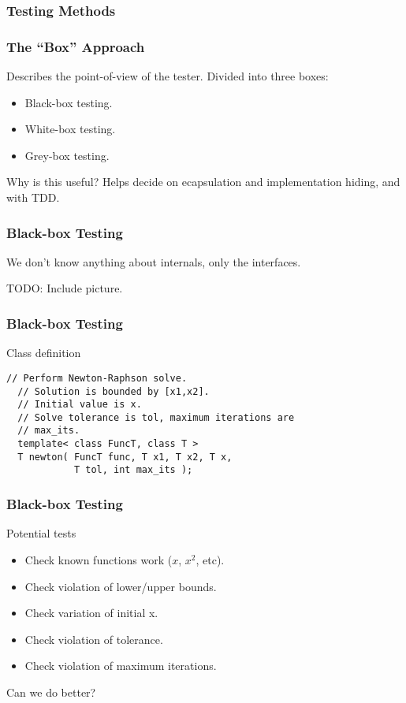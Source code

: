 \begin{frame}
  \frametitle{Testing Methods}
  \begin{tikzpicture}[overlay]  
  \end{tikzpicture}
\end{frame}

\begin{frame}
  \frametitle{The ``Box'' Approach}
  Describes the point-of-view of the tester.
  Divided into three boxes:
  \begin{itemize}
  \item Black-box testing.
  \item White-box testing.
  \item Grey-box testing.
  \end{itemize}
  Why is this useful? Helps decide on ecapsulation and
  implementation hiding, and with TDD.
\end{frame}

\begin{frame}
  \frametitle{Black-box Testing}
  We don't know anything about internals, only
  the interfaces.

  TODO: Include picture.
\end{frame}

\begin{frame}[fragile]
  \frametitle{Black-box Testing}
  \begin{block}{Class definition}
    \begin{lstlisting}[style=C]
  // Perform Newton-Raphson solve.
  // Solution is bounded by [x1,x2].
  // Initial value is x.
  // Solve tolerance is tol, maximum iterations are
  // max_its.
  template< class FuncT, class T >
  T newton( FuncT func, T x1, T x2, T x,
            T tol, int max_its );
    \end{lstlisting}
  \end{block}
\end{frame}

\begin{frame}[fragile]
  \frametitle{Black-box Testing}
  \begin{block}{Potential tests}
    \begin{itemize}
    \item Check known functions work ($x$, $x^2$, etc).
    \item Check violation of lower/upper bounds.
    \item Check variation of initial x.
    \item Check violation of tolerance.
    \item Check violation of maximum iterations.
    \end{itemize}
  \end{block}
  \pause
  \vspace{1cm}
  {\LARGE\color{Base0A} Can we do better?}
\end{frame}

